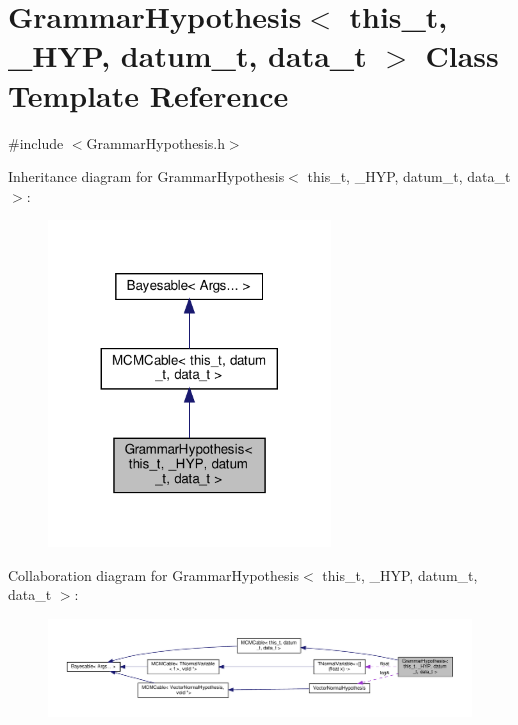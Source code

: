 \hypertarget{class_grammar_hypothesis}{}\section{Grammar\+Hypothesis$<$ this\+\_\+t, \+\_\+\+H\+YP, datum\+\_\+t, data\+\_\+t $>$ Class Template Reference}
\label{class_grammar_hypothesis}


{\ttfamily \#include $<$Grammar\+Hypothesis.\+h$>$}



Inheritance diagram for Grammar\+Hypothesis$<$ this\+\_\+t, \+\_\+\+H\+YP, datum\+\_\+t, data\+\_\+t $>$\+:
\nopagebreak
\begin{figure}[H]
\begin{center}
\leavevmode
\includegraphics[width=212pt]{class_grammar_hypothesis__inherit__graph}
\end{center}
\end{figure}


Collaboration diagram for Grammar\+Hypothesis$<$ this\+\_\+t, \+\_\+\+H\+YP, datum\+\_\+t, data\+\_\+t $>$\+:
\nopagebreak
\begin{figure}[H]
\begin{center}
\leavevmode
\includegraphics[width=350pt]{class_grammar_hypothesis__coll__graph}
\end{center}
\end{figure}

